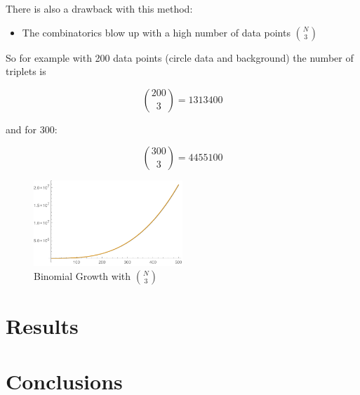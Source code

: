 \documentclass[10pt,twoside]{scrreprt}
\begin{document}
There is also a drawback with this method:

\begin{itemize}
\item The combinatorics blow up with a high number of data points \( \binom{N}{3} \)
\end{itemize}

So for example with 200 data points (circle data and background) the number of triplets is

\[ \binom{200}{3} = 1313400 \]

and for 300:

\[ \binom{300}{3} = 4455100 \]


\begin{figure}[tb]
  \centering
  \includegraphics[width=0.5\textwidth]{pics/binomial_growth}
  \caption{Binomial Growth with $\binom{N}{3}$}
  \label{fig:figure1}
\end{figure}

\chapter{Results}


\chapter{Conclusions} %
\label{cha:conclusions}


\printbibliography
\end{document}
